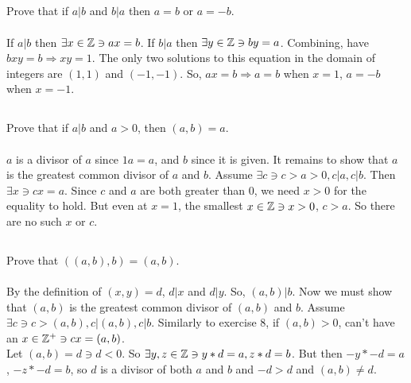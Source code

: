 \documentclass{article}
\begin{document}
\subsection{}
Prove that if $a|b$ and $b|a$ then $a = b$ or $a = -b$. \\~\\
If $a|b$ then $\exists x \in \mathbb{Z} \ni ax = b$.
If $b|a$ then $\exists y \in \mathbb{Z} \ni by = a$.
Combining, have $bxy = b \Rightarrow xy = 1$.
The only two solutions to this equation in the domain of integers
are $(1, 1)$ and $(-1, -1)$.
So, $ax = b \Rightarrow a = b$ when $x = 1$, $a = -b$ when $x = -1$.

\subsection{}
Prove that if $a|b$ and $a > 0$, then $(a, b) = a$. \\~\\
$a$ is a divisor of $a$ since $1a = a$, and $b$ since it is given.
It remains to show that $a$ is the greatest common divisor of $a$ and $b$.
Assume $\exists c \ni c > a > 0, c|a, c|b$.
Then $\exists x \ni cx = a$. Since $c$ and $a$ are both greater than 0,
we need $x > 0$ for the equality to hold. But even at $x = 1$, the smallest
$x \in \mathbb{Z} \ni x > 0$, $c > a$. So there are no such $x$ or $c$.

\subsection{}
Prove that $((a, b), b) = (a, b)$. \\~\\
By the definition of $(x, y) = d$, $d|x$ and $d|y$.
So, $(a, b)|b$.
Now we must show that $(a, b)$ is the greatest common divisor of $(a, b)$ and $b$.
Assume $\exists c \ni c > (a, b), c|(a, b), c|b$.
Similarly to exercise 8, if $(a, b) > 0$, can't have an $x \in \mathbb{Z}^+ \ni cx = (a, b)$.\\
Let $(a, b) = d \ni d < 0$.
So $\exists y, z \in \mathbb{Z} \ni y * d = a, z * d = b$.
But then $-y * -d = a$, $-z * -d = b$, so $d$ is a divisor of both $a$ and $b$
and $-d > d$ and $(a, b) \neq d$.

\end{document}
